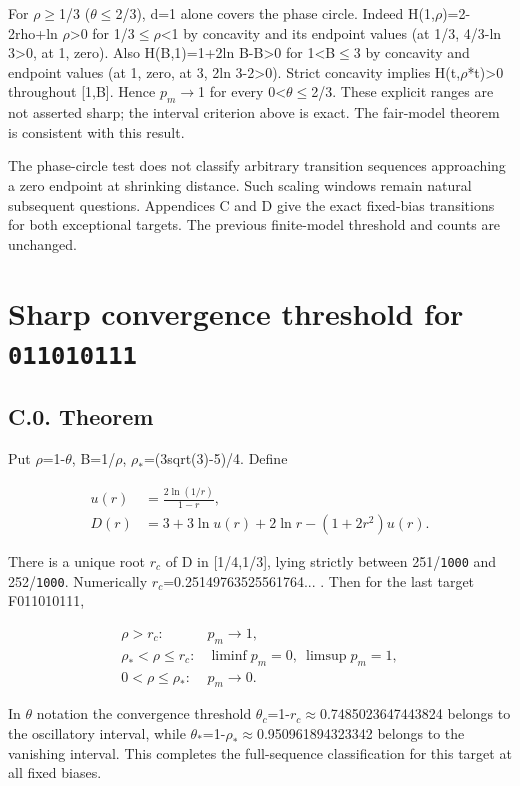 \documentclass[11pt]{article}
\begin{document}
For $\rho$\ensuremath{\geq}1/3 ($\theta$\ensuremath{\leq}2/3), d=1 alone covers the phase circle. Indeed H(1,$\rho$)=2-2rho+ln $\rho$>0 for 1/3\ensuremath{\leq}$\rho$<1 by concavity and its endpoint values (at 1/3, 4/3-ln 3>0, at 1, zero). Also H(B,1)=1+2ln B-B>0 for 1<B\ensuremath{\leq}3 by concavity and endpoint values (at 1, zero, at 3, 2ln 3-2>0). Strict concavity implies H(t,$\rho$*t)>0 throughout [1,B]. Hence $p_m$\ensuremath{\to}1 for every 0<$\theta$\ensuremath{\leq}2/3. These explicit ranges are not asserted sharp; the interval criterion above is exact. The fair-model theorem is consistent with this result.

The phase-circle test does not classify arbitrary transition sequences approaching a zero endpoint at shrinking distance. Such scaling windows remain natural subsequent questions. Appendices C and D give the exact fixed-bias transitions for both exceptional targets. The previous finite-model threshold and counts are unchanged.

\section{Sharp convergence threshold for \texttt{011010111}}

\subsection*{C.0. Theorem}

Put $\rho$=1-$\theta$, B=1/$\rho$, $\rho_{*}$=(3sqrt(3)-5)/4. Define

\[
\begin{aligned}u(r)&=\frac{2\ln(1/r)}{1-r},\\
D(r)&=3+3\ln u(r)+2\ln r-(1+2r^2)u(r).\end{aligned}
\]

There is a unique root $r_{c}$ of D in [1/4,1/3], lying strictly between 251/\texttt{1000} and 252/\texttt{1000}. Numerically $r_{c}$=0.25149763525561764... . Then for the last target F011010111,

\[
\begin{array}{ll}\rho>r_c:&p_m\to1,\\
\rho_*<\rho\leq r_c:&\liminf p_m=0,\ \limsup p_m=1,\\
0<\rho\leq\rho_*:&p_m\to0.\end{array}
\]

In $\theta$ notation the convergence threshold $\theta_{c}$=1-$r_{c}$\ensuremath{\approx}0.7485023647443824 belongs to the oscillatory interval, while $\theta_{*}$=1-$\rho_{*}$\ensuremath{\approx}0.950961894323342 belongs to the vanishing interval. This completes the full-sequence classification for this target at all fixed biases.
\end{document}

